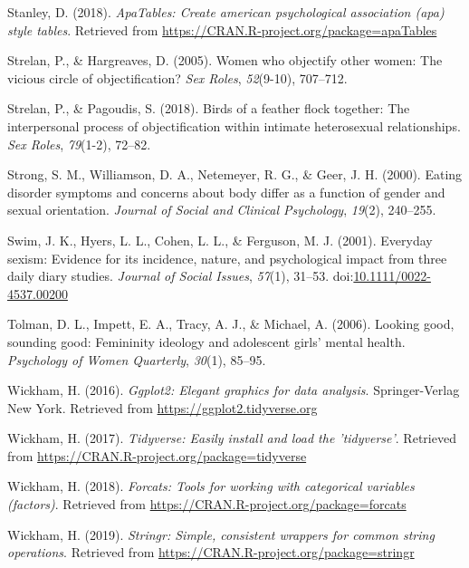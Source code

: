 \documentclass[
  man]{apa6}
\begin{document}
\leavevmode\hypertarget{ref-R-apaTables}{}%
Stanley, D. (2018). \emph{ApaTables: Create american psychological association (apa) style tables}. Retrieved from \url{https://CRAN.R-project.org/package=apaTables}

\leavevmode\hypertarget{ref-strelan2005women}{}%
Strelan, P., \& Hargreaves, D. (2005). Women who objectify other women: The vicious circle of objectification? \emph{Sex Roles}, \emph{52}(9-10), 707--712.

\leavevmode\hypertarget{ref-strelan2018birds}{}%
Strelan, P., \& Pagoudis, S. (2018). Birds of a feather flock together: The interpersonal process of objectification within intimate heterosexual relationships. \emph{Sex Roles}, \emph{79}(1-2), 72--82.

\leavevmode\hypertarget{ref-strong2000eating}{}%
Strong, S. M., Williamson, D. A., Netemeyer, R. G., \& Geer, J. H. (2000). Eating disorder symptoms and concerns about body differ as a function of gender and sexual orientation. \emph{Journal of Social and Clinical Psychology}, \emph{19}(2), 240--255.

\leavevmode\hypertarget{ref-swimetal}{}%
Swim, J. K., Hyers, L. L., Cohen, L. L., \& Ferguson, M. J. (2001). Everyday sexism: Evidence for its incidence, nature, and psychological impact from three daily diary studies. \emph{Journal of Social Issues}, \emph{57}(1), 31--53. doi:\href{https://doi.org/10.1111/0022-4537.00200}{10.1111/0022-4537.00200}

\leavevmode\hypertarget{ref-tolman2006looking}{}%
Tolman, D. L., Impett, E. A., Tracy, A. J., \& Michael, A. (2006). Looking good, sounding good: Femininity ideology and adolescent girls' mental health. \emph{Psychology of Women Quarterly}, \emph{30}(1), 85--95.

\leavevmode\hypertarget{ref-R-ggplot2}{}%
Wickham, H. (2016). \emph{Ggplot2: Elegant graphics for data analysis}. Springer-Verlag New York. Retrieved from \url{https://ggplot2.tidyverse.org}

\leavevmode\hypertarget{ref-R-tidyverse}{}%
Wickham, H. (2017). \emph{Tidyverse: Easily install and load the 'tidyverse'}. Retrieved from \url{https://CRAN.R-project.org/package=tidyverse}

\leavevmode\hypertarget{ref-R-forcats}{}%
Wickham, H. (2018). \emph{Forcats: Tools for working with categorical variables (factors)}. Retrieved from \url{https://CRAN.R-project.org/package=forcats}

\leavevmode\hypertarget{ref-R-stringr}{}%
Wickham, H. (2019). \emph{Stringr: Simple, consistent wrappers for common string operations}. Retrieved from \url{https://CRAN.R-project.org/package=stringr}
\end{document}
